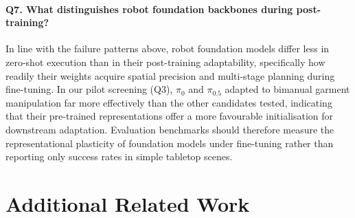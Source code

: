 \paragraph{Q7. What distinguishes robot foundation backbones during post-training?}
In line with the failure patterns above, robot foundation models differ less in zero-shot execution than in their post-training adaptability, specifically how readily their weights acquire spatial precision and multi-stage planning during fine-tuning. In our pilot screening (Q3), $\pi_0$ and $\pi_{0.5}$ adapted to bimanual garment manipulation far more effectively than the other candidates tested, indicating that their pre-trained representations offer a more favourable initialisation for downstream adaptation. Evaluation benchmarks should therefore measure the representational plasticity of foundation models under fine-tuning rather than reporting only success rates in simple tabletop scenes.

\section{Additional Related Work}\label{kai0:app:related}

